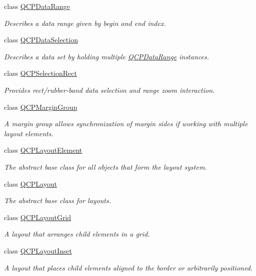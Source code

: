 \begin{DoxyCompactItemize}
class \hyperlink{class_q_c_p_data_range}{Q\+C\+P\+Data\+Range}
\begin{DoxyCompactList}\small\item\em Describes a data range given by begin and end index. \end{DoxyCompactList}\item 
class \hyperlink{class_q_c_p_data_selection}{Q\+C\+P\+Data\+Selection}
\begin{DoxyCompactList}\small\item\em Describes a data set by holding multiple \hyperlink{class_q_c_p_data_range}{Q\+C\+P\+Data\+Range} instances. \end{DoxyCompactList}\item 
class \hyperlink{class_q_c_p_selection_rect}{Q\+C\+P\+Selection\+Rect}
\begin{DoxyCompactList}\small\item\em Provides rect/rubber-\/band data selection and range zoom interaction. \end{DoxyCompactList}\item 
class \hyperlink{class_q_c_p_margin_group}{Q\+C\+P\+Margin\+Group}
\begin{DoxyCompactList}\small\item\em A margin group allows synchronization of margin sides if working with multiple layout elements. \end{DoxyCompactList}\item 
class \hyperlink{class_q_c_p_layout_element}{Q\+C\+P\+Layout\+Element}
\begin{DoxyCompactList}\small\item\em The abstract base class for all objects that form the layout system. \end{DoxyCompactList}\item 
class \hyperlink{class_q_c_p_layout}{Q\+C\+P\+Layout}
\begin{DoxyCompactList}\small\item\em The abstract base class for layouts. \end{DoxyCompactList}\item 
class \hyperlink{class_q_c_p_layout_grid}{Q\+C\+P\+Layout\+Grid}
\begin{DoxyCompactList}\small\item\em A layout that arranges child elements in a grid. \end{DoxyCompactList}\item 
class \hyperlink{class_q_c_p_layout_inset}{Q\+C\+P\+Layout\+Inset}
\begin{DoxyCompactList}\small\item\em A layout that places child elements aligned to the border or arbitrarily positioned. \end{DoxyCompactList}\item 

\end{DoxyCompactItemize}
